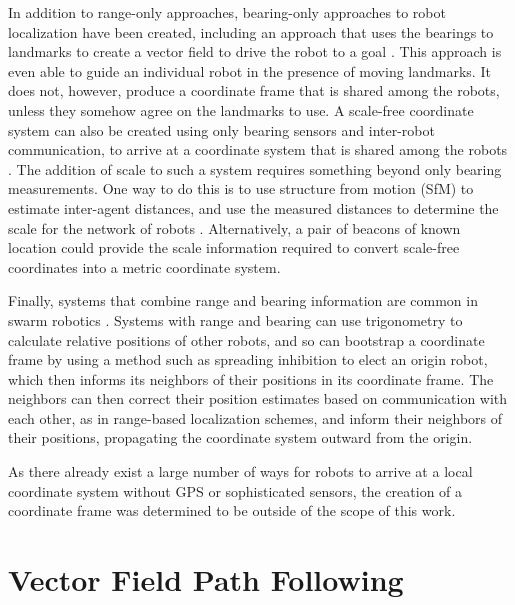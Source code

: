 In addition to range-only approaches, bearing-only approaches to robot localization have been created, including an approach that uses the bearings to landmarks to create a vector field to drive the robot to a goal \citep{loizou2007biologically}. 
This approach is even able to guide an individual robot in the presence of moving landmarks. 
It does not, however, produce a coordinate frame that is shared among the robots, unless they somehow agree on the landmarks to use. 
A scale-free coordinate system can also be created using only bearing sensors and inter-robot communication, to arrive at a coordinate system that is shared among the robots \citep{cornejo2013scale}.
The addition of scale to such a system requires something beyond only bearing measurements. 
One way to do this is to use structure from motion (SfM) to estimate inter-agent distances, and use the measured distances to determine the scale for the network of robots \citep{spica2016active}. 
Alternatively, a pair of beacons of known location could provide the scale information required to convert scale-free coordinates into a metric coordinate system. 

Finally, systems that combine range and bearing information are common in swarm robotics \citep{caprari1998autonomous, mondada2009puck, arvin2009development, farrow2014miniature}. 
Systems with range and bearing can use trigonometry to calculate relative positions of other robots, and so can bootstrap a coordinate frame by using a method such as spreading inhibition to elect an origin robot, which then informs its neighbors of their positions in its coordinate frame. The neighbors can then correct their position estimates based on communication with each other, as in range-based localization schemes, and inform their neighbors of their positions, propagating the coordinate system outward from the origin. 

As there already exist a large number of ways for robots to arrive at a local coordinate system without GPS or sophisticated sensors, the creation of a coordinate frame was determined to be outside of the scope of this work. 

\section{Vector Field Path Following}

